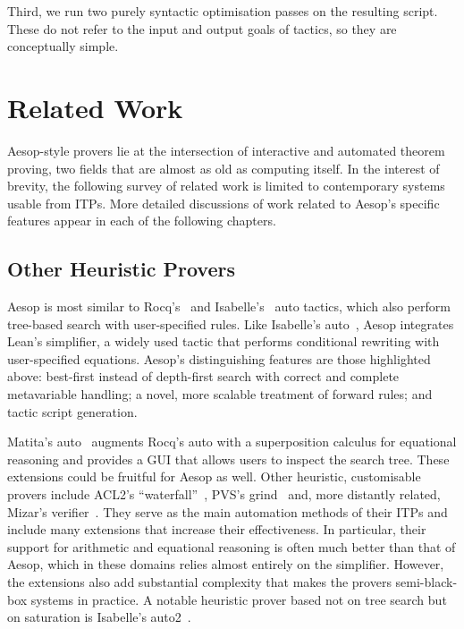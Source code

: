 Third, we run two purely syntactic optimisation passes on the resulting script.
These do not refer to the input and output goals of tactics, so they are conceptually simple.

\section{Related Work}

Aesop-style provers lie at the intersection of interactive and automated theorem proving, two fields that are almost as old as computing itself.
In the interest of brevity, the following survey of related work is limited to contemporary systems usable from ITPs.
More detailed discussions of work related to Aesop's specific features appear in each of the following chapters.

\subsection{Other Heuristic Provers}

Aesop is most similar to Rocq's~\cite{Rocq} and Isabelle's~\cite{Isabelle} auto tactics, which also perform tree-based search with user-specified rules.
Like Isabelle's auto~\cite{IsabelleAuto}, Aesop integrates Lean's simplifier, a widely used tactic that performs conditional rewriting with user-specified equations.
Aesop's distinguishing features are those highlighted above: best-first instead of depth-first search with correct and complete metavariable handling; a novel, more scalable treatment of forward rules; and tactic script generation.

Matita's auto~\cite{Matita} augments Rocq's auto with a superposition calculus for equational reasoning and provides a GUI that allows users to inspect the search tree.
These extensions could be fruitful for Aesop as well.
Other heuristic, customisable provers include ACL2's \enquote{waterfall}~\cite{ACL2}, PVS's grind~\cite{PVS} and, more distantly related, Mizar's verifier~\cite{MizarOverview2015}.
They serve as the main automation methods of their ITPs and include many extensions that increase their effectiveness.
In particular, their support for arithmetic and equational reasoning is often much better than that of Aesop, which in these domains relies almost entirely on the simplifier.
However, the extensions also add substantial complexity that makes the provers semi-black-box systems in practice.
A notable heuristic prover based not on tree search but on saturation is Isabelle's auto2~\cite{auto2}.


